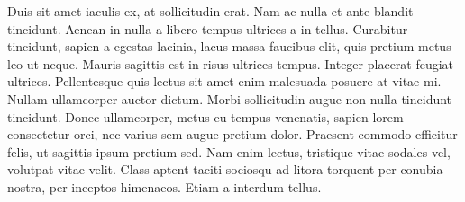 Duis sit amet iaculis ex, at sollicitudin erat. Nam ac nulla et ante blandit tincidunt. Aenean in nulla a libero tempus ultrices a in tellus. Curabitur tincidunt, sapien a egestas lacinia, lacus massa faucibus elit, quis pretium metus leo ut neque. Mauris sagittis est in risus ultrices tempus. Integer placerat feugiat ultrices. Pellentesque quis lectus sit amet enim malesuada posuere at vitae mi. Nullam ullamcorper auctor dictum. Morbi sollicitudin augue non nulla tincidunt tincidunt. Donec ullamcorper, metus eu tempus venenatis, sapien lorem consectetur orci, nec varius sem augue pretium dolor. Praesent commodo efficitur felis, ut sagittis ipsum pretium sed. Nam enim lectus, tristique vitae sodales vel, volutpat vitae velit. Class aptent taciti sociosqu ad litora torquent per conubia nostra, per inceptos himenaeos. Etiam a interdum tellus. 
